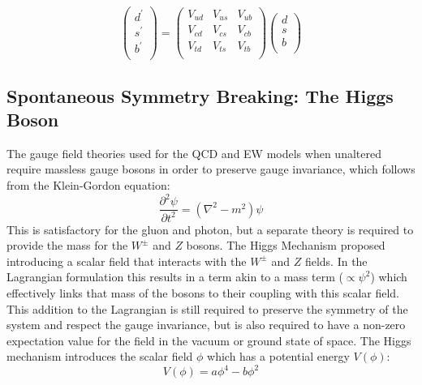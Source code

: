 		\begin{equation}
		\begin{pmatrix}
		d^\prime \\
		s^\prime\\
		b^\prime \\
		\end{pmatrix}
		 = \begin{pmatrix}
		V_{ud} & V_{us} & V_{ub} \\
		V_{cd} & V_{cs} & V_{cb} \\
		V_{td} & V_{ts} & V_{tb} \\
		\end{pmatrix}
	    \begin{pmatrix}
	    d \\
	    s\\
	    b \\
	    \end{pmatrix}
		\end{equation}
		
		
		
	\subsection{Spontaneous Symmetry Breaking: The Higgs Boson}
	\label{t:symbreak}
	
	The gauge field theories used for the QCD and EW models when unaltered require massless gauge bosons in order to preserve gauge invariance, which follows from the Klein-Gordon equation:
	\begin{equation}
		\frac{\partial^2\psi}{\partial t^2} = (\nabla^2 - m^2)\psi
	\end{equation}
	 This is satisfactory for the gluon and photon, but a separate theory is required to provide the mass for the $W^\pm$ and $Z$ bosons. The Higgs Mechanism  proposed introducing a scalar field that interacts with the $W^\pm$ and $Z$ fields. In the Lagrangian formulation this results in a term akin to a mass term ($\propto\psi^2$) which effectively links that mass of the bosons to their coupling with this scalar field. This addition to the Lagrangian is still required to preserve the symmetry of the system and respect the gauge invariance, but is also required to have a non-zero expectation value for the field in the vacuum or ground state of space. The Higgs mechanism introduces the scalar field $\phi$ which has a potential energy $V(\phi)$: 
	 \begin{equation}
		 V(\phi) = a\phi^4 - b\phi^2
	 \end{equation} 
	 

